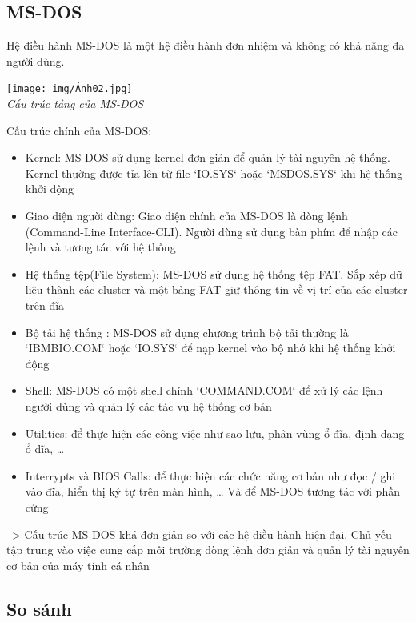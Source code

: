 \documentclass[12pt,a4paper]{article}
\begin{document}
\subsection{MS-DOS}
Hệ điều hành MS-DOS là một hệ điều hành đơn nhiệm và không có khả năng đa người dùng. 
\begin{center}
	\texttt{[image: img/Ảnh02.jpg]}\\
	\textit{Cấu trúc tầng của MS-DOS}
\end{center}
Cấu trúc chính của MS-DOS:
\begin{itemize}
	\item Kernel: MS-DOS sử dụng kernel đơn giản để quản lý tài nguyên hệ thống. Kernel thường được tỉa lên từ file `IO.SYS` hoặc `MSDOS.SYS` khi hệ thống khởi động
	\item Giao diện người dùng: Giao diện chính của MS-DOS là dòng lệnh (Command-Line Interface-CLI). Người dùng sử dụng bàn phím để nhập các lệnh và tương tác với hệ thống
	\item Hệ thống tệp(File System): MS-DOS sử dụng hệ thống tệp FAT. Sắp xếp dữ liệu thành các cluster và một bảng FAT giữ thông tin về vị trí của các cluster trên đĩa
	\item Bộ tải hệ thống : MS-DOS sử dụng chương trình bộ tải thường là `IBMBIO.COM` hoặc `IO.SYS` để nạp kernel vào bộ nhớ khi hệ thống khởi động
	\item Shell:  MS-DOS có một shell chính `COMMAND.COM` để xử lý các lệnh người dùng và quản lý các tác vụ hệ thống cơ bản
	\item Utilities:  để thực hiện các công việc như sao lưu, phân vùng ổ đĩa, định dạng ổ đĩa, …
	\item Interrypts và BIOS Calls:  để thực hiện các chức năng cơ bản như đọc / ghi vào đĩa, hiển thị ký tự trên màn hình, … Và để MS-DOS tương tác với phần cứng
\end{itemize}
--> Cấu trúc MS-DOS khá đơn giản so với các hệ diều hành hiện đại. Chủ yếu tập trung vào việc cung cấp môi trường dòng lệnh đơn giản và quản lý tài nguyên cơ bản của máy tính cá nhân
\subsection{So sánh}
\end{document}
